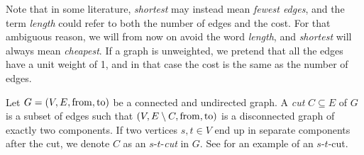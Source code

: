 Note that in some literature, \emph{shortest} may instead mean \emph{fewest edges}, and the term \emph{length} could refer to both the number of edges and the cost. For that ambiguous reason, we will from now on avoid the word \emph{length}, and \emph{shortest} will always mean \emph{cheapest}. If a graph is unweighted, we pretend that all the edges have a unit weight of 1, and in that case the cost is the same as the number of edges.



\begin{definition}[Cut]
    Let $G = (V, E, \operatorname{from}, \operatorname{to})$ be a connected and undirected graph. A \emph{cut} $C \subseteq E$ of $G$ is a subset of edges such that $(V, E \setminus C, \operatorname{from}, \operatorname{to})$ is a disconnected graph of exactly two components. If two vertices $s,t \in V$ end up in separate components after the cut, we denote $C$ as an $s$-$t$-\emph{cut} in $G$. See  for an example of an $s$-$t$-cut.
\end{definition}

